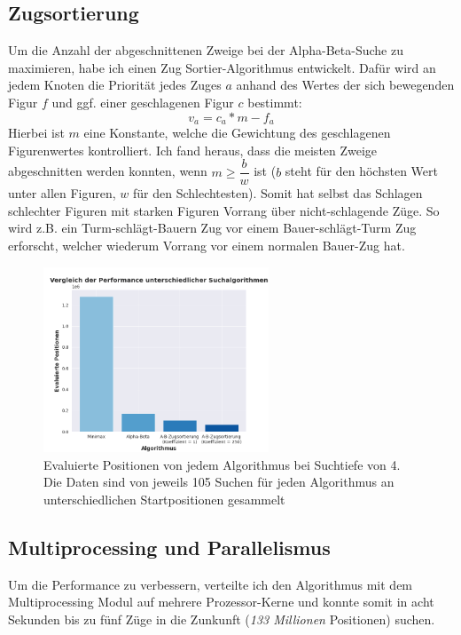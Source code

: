 \documentclass{jpp}
\begin{document}
\subsection{Zugsortierung}
Um die Anzahl der abgeschnittenen Zweige bei der Alpha-Beta-Suche zu maximieren, habe ich einen Zug Sortier-Algorithmus entwickelt. Dafür wird an jedem Knoten die Priorität jedes Zuges $a$ anhand des Wertes der sich bewegenden Figur $f$ und ggf. einer geschlagenen Figur $c$ bestimmt:
\[v_a = c_a * m - f_a\]
Hierbei ist $m$ eine Konstante, welche die Gewichtung des geschlagenen Figurenwertes kontrolliert. Ich fand heraus, dass die meisten Zweige abgeschnitten werden konnten, wenn $m \geq \dfrac{b}{w}$ ist ($b$ steht für den höchsten Wert unter allen Figuren, $w$ für den Schlechtesten). Somit hat selbst das Schlagen schlechter Figuren mit starken Figuren Vorrang über nicht-schlagende Züge. So wird z.B. ein Turm-schlägt-Bauern Zug vor einem Bauer-schlägt-Turm Zug erforscht, welcher wiederum Vorrang vor einem normalen Bauer-Zug hat.

\begin{figure}
    \centering
    \includegraphics[width={0.6\textwidth}]{imgs/comp.png}
    \caption{Evaluierte Positionen von jedem Algorithmus bei Suchtiefe von 4.
    Die Daten sind von jeweils 105 Suchen für jeden Algorithmus an unterschiedlichen Startpositionen gesammelt}
    \label{fig:my_label}
\end{figure}

\subsection{Multiprocessing und Parallelismus}
Um die Performance zu verbessern, verteilte ich den Algorithmus mit dem Multiprocessing Modul auf mehrere Prozessor-Kerne und konnte somit in acht Sekunden bis zu fünf Züge in die Zunkunft (\textit{133 Millionen} Positionen) suchen. 
\end{document}
